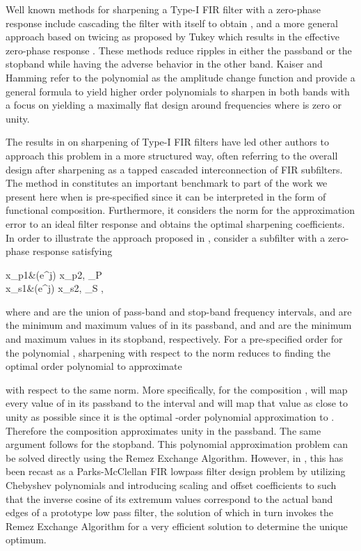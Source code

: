 \documentclass[journal] {IEEEtran}
\begin{document}
Well known methods for sharpening a Type-I FIR filter with a zero-phase response  include cascading the filter with itself to obtain , and a more general approach based on twicing as proposed by  Tukey \cite{Tukey} which results in the effective zero-phase response . These methods reduce ripples in either the passband or the stopband while having the adverse behavior in the other band. Kaiser and Hamming \cite{Kaiser1977} refer to the polynomial  as the amplitude change function and provide a general formula to yield higher order polynomials to sharpen  in both bands with a focus on yielding a maximally flat design around frequencies where  is zero or unity.

The results in \cite{Kaiser1977} on sharpening of Type-I FIR filters have led other authors \cite{Nakamura, Saramaki, Hartnett1995, Chen, Saramaki2006, Saramaki2009, Samadi2000} to approach this problem in a more structured way, often referring to the overall design after sharpening as a tapped cascaded interconnection of FIR subfilters. The method in \cite{Saramaki} constitutes an important benchmark to part of the work we present here when  is pre-specified since it can be interpreted in the form of functional composition. Furthermore, it considers the  norm for the approximation error to an ideal filter response and obtains the optimal sharpening coefficients. In order to illustrate the approach proposed in \cite{Saramaki}, consider a subfilter with a zero-phase response  satisfying

x_{p1}&\le {}(e^{j\omega}) \le x_{p2}, \;\; \omega\in \Omega_P \label{eqn:framewok::subfilter_spec_pass}\\
x_{s1}&\le {}(e^{j\omega}) \le x_{s2}, \;\; \omega\in \Omega_S \label{eqn:framewok::subfilter_spec_stop},

where  and  are the union of pass-band and stop-band frequency intervals,  and  are the minimum and maximum values of  in its passband, and  and  are the minimum and maximum values in its stopband, respectively. For a pre-specified order  for the polynomial , sharpening with respect to the  norm reduces to finding the optimal  order polynomial to approximate

with respect to the same norm. More specifically, for the composition ,  will map every value of  in its passband to the interval  and  will map that value as close to unity as possible since it is the optimal -order polynomial approximation to . Therefore the composition  approximates unity in the passband. The same argument follows for the stopband. This polynomial approximation problem can be solved directly using the Remez Exchange Algorithm. However, in \cite{Saramaki}, this has been recast as a Parks-McClellan FIR lowpass filter design problem by utilizing Chebyshev polynomials and introducing scaling and offset coefficients to  such that the inverse cosine of its extremum values correspond to the actual band edges of a prototype low pass filter, the solution of which in turn invokes the Remez Exchange Algorithm for a very efficient solution to determine the unique optimum.
\end{document}
